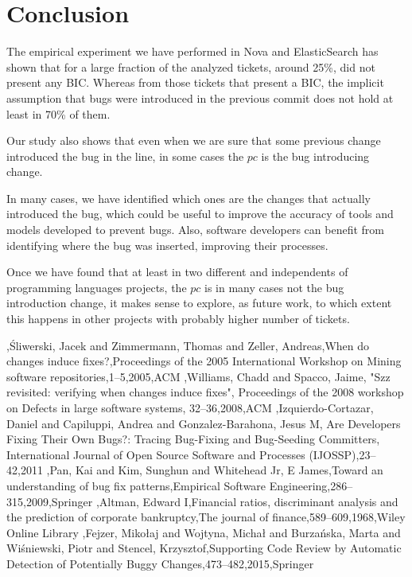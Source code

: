 \documentclass[conference]{IEEEtran}
\begin{document}
\section{Conclusion}
The empirical experiment we have performed in Nova and ElasticSearch has shown that for a large fraction of the analyzed tickets, around 25\%, did not present any BIC. Whereas from those tickets that present a BIC, the implicit assumption that bugs were introduced in the previous commit does not hold at least in 70\% of them.

Our study also shows that even when we are sure that some previous change introduced the bug in the line, in some cases the $pc$ is the bug introducing change. %

In many cases, we have identified which ones are the changes that actually introduced the bug, which could be useful to improve the accuracy of tools and models developed to prevent bugs. Also, software developers can benefit from identifying where the bug was inserted, improving their processes.

Once we have found that at least in two different and independents of programming languages projects, the $pc$ is in many cases not the bug introduction change, it makes sense to explore, as future work, to which extent this happens in other projects with probably higher number of tickets.


\begin{thebibliography}{1}

,{\'S}liwerski, Jacek and Zimmermann, Thomas and Zeller, Andreas,When do changes induce fixes?,Proceedings of the 2005 International Workshop on Mining software repositories,1--5,2005,ACM
,Williams, Chadd and Spacco, Jaime, "Szz revisited: verifying when changes induce fixes", Proceedings of the 2008 workshop on Defects in large software systems, 32--36,2008,ACM
,Izquierdo-Cortazar, Daniel and Capiluppi, Andrea and Gonzalez-Barahona, Jesus M, Are Developers Fixing Their Own Bugs?: Tracing Bug-Fixing and Bug-Seeding Committers,
  International Journal of Open Source Software and Processes (IJOSSP),23--42,2011
,Pan, Kai and Kim, Sunghun and Whitehead Jr, E James,Toward an understanding of bug fix patterns,Empirical Software Engineering,286--315,2009,Springer
,Altman, Edward I,Financial ratios, discriminant analysis and the prediction of corporate bankruptcy,The journal of finance,589--609,1968,Wiley Online Library
,Fejzer, Miko{\l}aj and Wojtyna, Micha{\l} and Burza{\'n}ska, Marta and Wi{\'s}niewski, Piotr and Stencel, Krzysztof,Supporting Code Review by Automatic Detection of Potentially Buggy Changes,473--482,2015,Springer
\end{thebibliography}




\end{document}
